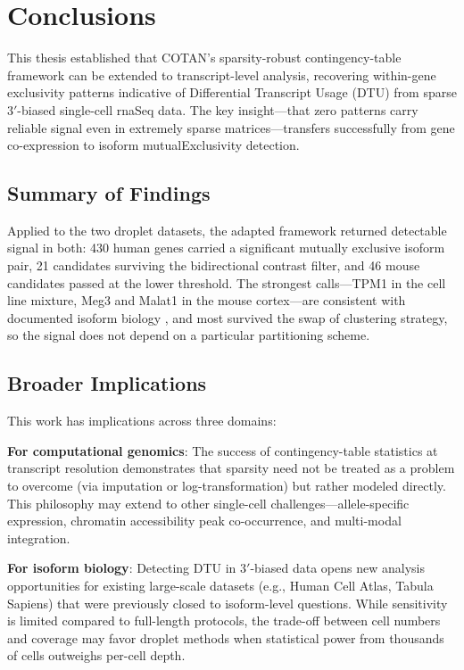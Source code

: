 \chapter{Conclusions}

This thesis established that COTAN's sparsity-robust contingency-table framework can be extended to transcript-level analysis, recovering within-gene exclusivity patterns indicative of Differential Transcript Usage (DTU) from sparse $3'$-biased single-cell \gls{rnaSeq} data. The key insight---that zero patterns carry reliable signal even in extremely sparse matrices---transfers successfully from gene co-expression to isoform \gls{mutualExclusivity} detection.

\section{Summary of Findings}

Applied to the two droplet datasets, the adapted framework returned detectable signal in both: 430 human genes carried a significant mutually exclusive isoform pair, 21 candidates surviving the bidirectional contrast filter, and 46 mouse candidates passed at the lower threshold. The strongest calls---TPM1 in the cell line mixture, Meg3 and Malat1 in the mouse cortex---are consistent with documented isoform biology \cite{ghanam2023malat1, xue2012specialized}, and most survived the swap of clustering strategy, so the signal does not depend on a particular partitioning scheme.

\section{Broader Implications}

This work has implications across three domains:

\textbf{For computational genomics}: The success of contingency-table statistics at transcript resolution demonstrates that sparsity need not be treated as a problem to overcome (via imputation or log-transformation) but rather modeled directly. This philosophy may extend to other single-cell challenges---allele-specific expression, chromatin accessibility peak co-occurrence, and multi-modal integration.

\textbf{For isoform biology}: Detecting DTU in $3'$-biased data opens new analysis opportunities for existing large-scale datasets (e.g., Human Cell Atlas, Tabula Sapiens) that were previously closed to isoform-level questions. While sensitivity is limited compared to full-length protocols, the trade-off between cell numbers and coverage may favor droplet methods when statistical power from thousands of cells outweighs per-cell depth.

